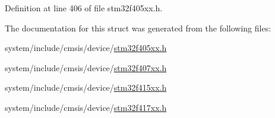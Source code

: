 Definition at line 406 of file stm32f405xx.\+h.



The documentation for this struct was generated from the following files\+:\begin{DoxyCompactItemize}
\item 
system/include/cmsis/device/\hyperlink{stm32f405xx_8h}{stm32f405xx.\+h}\item 
system/include/cmsis/device/\hyperlink{stm32f407xx_8h}{stm32f407xx.\+h}\item 
system/include/cmsis/device/\hyperlink{stm32f415xx_8h}{stm32f415xx.\+h}\item 
system/include/cmsis/device/\hyperlink{stm32f417xx_8h}{stm32f417xx.\+h}\end{DoxyCompactItemize}
